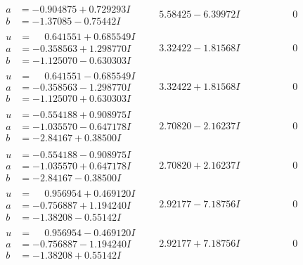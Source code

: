 \documentclass[1p]{elsarticle_modified}
\theoremstyle{definition}
\begin{document}
$$\begin{array}{c|c|c}
\begin{aligned}
a &= -0.904875 + 0.729293 I \\
b &= -1.37085 - 0.75442 I\end{aligned}
 & \phantom{-}5.58425 - 6.39972 I & \phantom{-0.000000 } 0 \\ \hline\begin{aligned}
u &= \phantom{-}0.641551 + 0.685549 I \\
a &= -0.358563 + 1.298770 I \\
b &= -1.125070 - 0.630303 I\end{aligned}
 & \phantom{-}3.32422 - 1.81568 I & \phantom{-0.000000 } 0 \\ \hline\begin{aligned}
u &= \phantom{-}0.641551 - 0.685549 I \\
a &= -0.358563 - 1.298770 I \\
b &= -1.125070 + 0.630303 I\end{aligned}
 & \phantom{-}3.32422 + 1.81568 I & \phantom{-0.000000 } 0 \\ \hline\begin{aligned}
u &= -0.554188 + 0.908975 I \\
a &= -1.035570 - 0.647178 I \\
b &= -2.84167 + 0.38500 I\end{aligned}
 & \phantom{-}2.70820 - 2.16237 I & \phantom{-0.000000 } 0 \\ \hline\begin{aligned}
u &= -0.554188 - 0.908975 I \\
a &= -1.035570 + 0.647178 I \\
b &= -2.84167 - 0.38500 I\end{aligned}
 & \phantom{-}2.70820 + 2.16237 I & \phantom{-0.000000 } 0 \\ \hline\begin{aligned}
u &= \phantom{-}0.956954 + 0.469120 I \\
a &= -0.756887 + 1.194240 I \\
b &= -1.38208 - 0.55142 I\end{aligned}
 & \phantom{-}2.92177 - 7.18756 I & \phantom{-0.000000 } 0 \\ \hline\begin{aligned}
u &= \phantom{-}0.956954 - 0.469120 I \\
a &= -0.756887 - 1.194240 I \\
b &= -1.38208 + 0.55142 I\end{aligned}
 & \phantom{-}2.92177 + 7.18756 I & \phantom{-0.000000 } 0 \\ \hline\begin{aligned}

\end{aligned}
\end{array}$$
\end{document}
